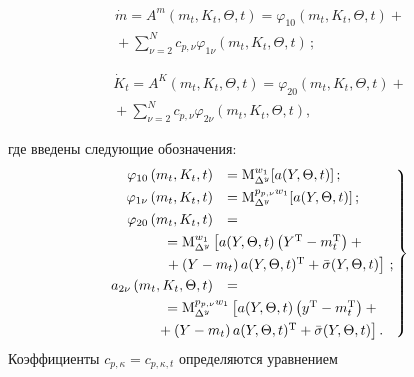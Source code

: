 \begin{multicols}{2}
\vspace*{-2pt}

\noindent
   \begin{multline}
  \dot m= A^m \left(m_t, K_t, \Theta, t\right) = 
    \varphi_{10}\left(m_t,K_t,\Theta, t\right)+{}\\
 {}+\sum\limits_{\nu=2}^N
    c_{p,\nu}\varphi_{1\nu}\left(m_t,K_t,\Theta, t\right)\,;
    \label{e3.12-sin}
\end{multline}


\noindent
\begin{multline}
\dot K_t=A^K \left(m_t, K_t, \Theta, t\right) =
    \varphi_{20}\left(m_t,K_t,\Theta,t\right)+{}\\
{}+\sum\limits_{\nu=2}^N
    c_{p,\nu}\varphi_{2\nu}\left(m_t,K_t,\Theta,t\right),
      \label{e3.13-sin}
    \end{multline}

    
    \noindent
где введены следующие обозначения:
    \begin{equation}
    \left.
\begin{array}{rl}
        \hspace*{-2mm}\varphi_{10}\left(m_t,K_t,t\right)&=\mm_{\Delta^y}^{w_1} 
    [a(Y,\Theta, t)]\,; %
    \\[4pt]
    \hspace*{-2mm}\varphi_{1\nu}\left(m_t,K_t,t\right)&=\mm_{\Delta^y}^{p_{p,\nu}w_1}
[a(Y,\Theta, t)]\,; %
\\[4pt]
    \hspace*{-3mm}\varphi_{20}\left(m_t,K_t,t\right)&={}\\[4pt]
&\hspace*{-16mm}{}=\mm_{\Delta^y}^{w_1}
    \left[a(Y,\Theta,t)\left(Y^{\mathrm{T}}-m_t^{\mathrm{T}}\right)+{}\right.\\[4pt]
    &\left.\hspace*{-16mm}{}+
    \left(Y-m_t\right) a(Y,\Theta,t)^{\mathrm{T}}  +{\bar\sigma}(Y,\Theta, t)\right]\,;
    \\[3pt]
    \hspace*{-2mm}a_{2\nu}\left(m_t,K_t,\Theta, t\right)&={}\\[4pt]
&\hspace*{-16mm}{}=\mm_{\Delta^y}^{p_{p,\nu}w_1}
    \left[a(Y,\Theta,t)\left(y^{\mathrm{T}}-m_t^{\mathrm{T}}\right)+{}\right.\\[4pt]
&\hspace*{-18mm}\left.{}+    \left(Y-m_t\right) a(Y,\Theta, t)^{\mathrm{T}}+{\bar\sigma}(Y,\Theta,t)\right].
\end{array}\!\!
\right\}
    \label{e3.17-sin}
    \end{equation}
Коэффициенты $c_{p,\kappa}= c_{p,\kappa,t}$ определяются уравнением


\end{multicols}
